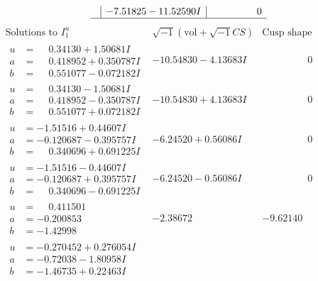 \documentclass[1p]{elsarticle_modified}
\theoremstyle{definition}
\newcommand{\I}{\sqrt{-1}}
\begin{document}
$$\begin{array}{c|c|c}
 & -7.51825 - 11.52590 I & \phantom{-0.000000 } 0\\
 \hline 
 \end{array}$$\newpage$$\begin{array}{c|c|c}  
\text{Solutions to }I^u_{1}& \I (\text{vol} + \sqrt{-1}CS) & \text{Cusp shape}\\
 \hline 
\begin{aligned}
u &= \phantom{-}0.34130 + 1.50681 I \\
a &= \phantom{-}0.418952 + 0.350787 I \\
b &= \phantom{-}0.551077 - 0.072182 I\end{aligned}
 & -10.54830 - 4.13683 I & \phantom{-0.000000 } 0 \\ \hline\begin{aligned}
u &= \phantom{-}0.34130 - 1.50681 I \\
a &= \phantom{-}0.418952 - 0.350787 I \\
b &= \phantom{-}0.551077 + 0.072182 I\end{aligned}
 & -10.54830 + 4.13683 I & \phantom{-0.000000 } 0 \\ \hline\begin{aligned}
u &= -1.51516 + 0.44607 I \\
a &= -0.120687 - 0.395757 I \\
b &= \phantom{-}0.340696 + 0.691225 I\end{aligned}
 & -6.24520 + 0.56086 I & \phantom{-0.000000 } 0 \\ \hline\begin{aligned}
u &= -1.51516 - 0.44607 I \\
a &= -0.120687 + 0.395757 I \\
b &= \phantom{-}0.340696 - 0.691225 I\end{aligned}
 & -6.24520 - 0.56086 I & \phantom{-0.000000 } 0 \\ \hline\begin{aligned}
u &= \phantom{-}0.411501\phantom{ +0.000000I} \\
a &= -0.200853\phantom{ +0.000000I} \\
b &= -1.42998\phantom{ +0.000000I}\end{aligned}
 & -2.38672\phantom{ +0.000000I} & -9.62140\phantom{ +0.000000I} \\ \hline\begin{aligned}
u &= -0.270452 + 0.276054 I \\
a &= -0.72038 - 1.80958 I \\
b &= -1.46735 + 0.22463 I\end{aligned}

\end{array}$$
\end{document}
